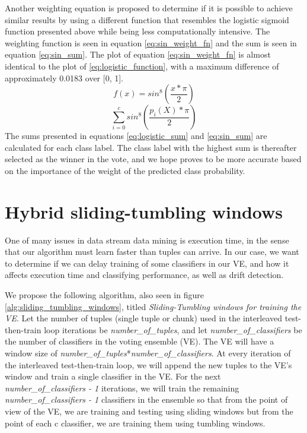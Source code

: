 Another weighting equation is proposed to determine if it is possible to achieve similar results by using a different function that resembles the logistic sigmoid function presented above while being less computationally intensive.
The weighting function is seen in equation \ref{eq:sin_weight_fn} and the sum is seen in equation \ref{eq:sin_sum}. The plot of equation \ref{eq:sin_weight_fn} is almost identical to the plot of \ref{eq:logistic_function}, with a maximum difference of approximately 0.0183 over [0, 1].
\begin{equation}
    f(x)=sin^8(\frac{x*\pi}{2})
    \label{eq:sin_weight_fn}
\end{equation}
\begin{equation}
\sum_{i=0}^{c} sin^8(\frac{p_i(X)*\pi}{2})
    \label{eq:sin_sum}
\end{equation}
The sums presented in equations \ref{eq:logistic_sum} and \ref{eq:sin_sum} are calculated for each class label. The class label with the highest sum is thereafter selected as the winner in the vote, and we hope proves to be more accurate based on the importance of the weight of the predicted class probability.


\section{Hybrid sliding-tumbling windows}
One of many issues in data stream data mining is execution time, in the sense that our algorithm must learn faster than tuples can arrive. In our case, we want to determine if we can delay training of some classifiers in our VE, and how it affects execution time and classifying performance, as well as drift detection.

We propose the following algorithm, also seen in figure \ref{alg:sliding_tumbling_windows}, titled \textit{Sliding-Tumbling windows for training the VE}.
Let the number of tuples (single tuple or chunk) used in the interleaved test-then-train loop iterations be \textit{number\_of\_tuples}, and let \textit{number\_of\_classifiers} be the number of classifiers in the voting ensemble (VE). The VE will have a window size of \textit{number\_of\_tuples}*\textit{number\_of\_classifiers}. At every iteration of the interleaved test-then-train loop, we will append the new tuples to the VE's window and train a single classifier in the VE. For the next \textit{number\_of\_classifiers - 1} iterations, we will train the remaining \textit{number\_of\_classifiers - 1} classifiers in the ensemble so that from the point of view of the VE, we are training and testing using sliding windows but from the point of each c classifier, we are training them using tumbling windows.

